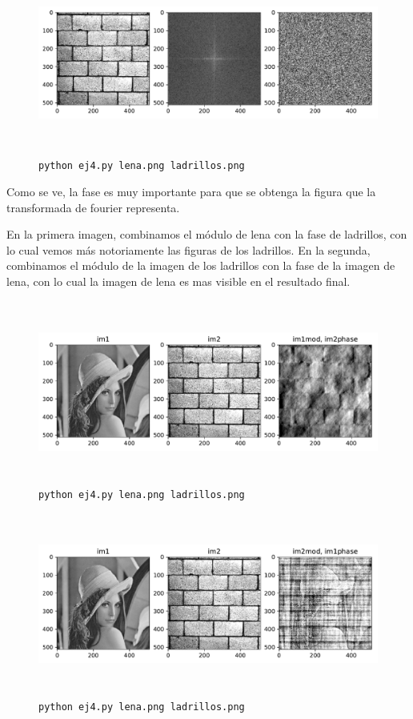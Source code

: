 \documentclass[11pt, spanish]{article}
\begin{document}
\begin{figure}[H]
\centering
  \includegraphics[height=6cm]{informe-imgs/ej4-ladrillos.pdf}
  \caption{\texttt{python ej4.py lena.png ladrillos.png}}
\end{figure}

Como se ve, la fase es muy importante para que se obtenga la figura que la transformada de fourier representa.

En la primera imagen, combinamos el módulo de lena con la fase de ladrillos, con lo cual vemos más notoriamente las
figuras de los ladrillos.
En la segunda, combinamos el módulo de la imagen de los ladrillos con la fase de la imagen de lena, con lo cual la
imagen de lena es mas visible en el resultado final.
\begin{figure}[H]
\centering
  \includegraphics[height=6cm]{informe-imgs/ej4-a.pdf}
  \caption{\texttt{python ej4.py lena.png ladrillos.png}}
\end{figure}

\begin{figure}[H]
\centering
  \includegraphics[height=6cm]{informe-imgs/ej4-b.pdf}
  \caption{\texttt{python ej4.py lena.png ladrillos.png}}
\end{figure}
\end{document}
